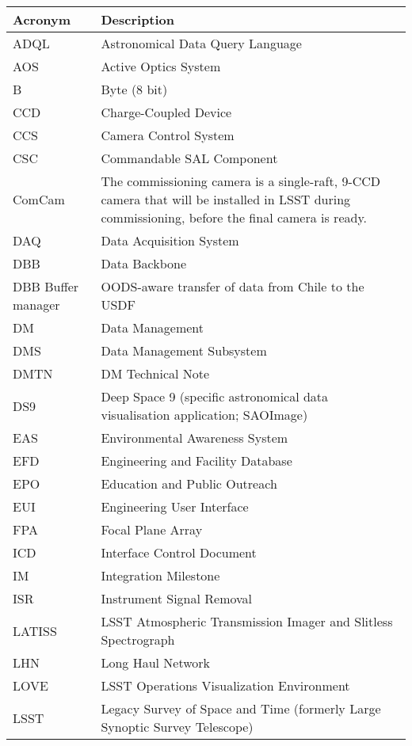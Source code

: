 \addtocounter{table}{-1}
\begin{longtable}{p{}p{}}\hline
\textbf{Acronym} & \textbf{Description}  \\\hline

ADQL & Astronomical Data Query Language \\\hline
AOS & Active Optics System \\\hline
B & Byte (8 bit) \\\hline
CCD & Charge-Coupled Device \\\hline
CCS & Camera Control System \\\hline
CSC & Commandable SAL Component \\\hline
ComCam & The commissioning camera is a single-raft, 9-CCD camera that will be installed in LSST during commissioning, before the final camera is ready. \\\hline
DAQ & Data Acquisition System \\\hline
DBB & Data Backbone \\\hline
DBB Buffer manager & OODS-aware transfer of data from Chile to the USDF \\\hline
DM & Data Management \\\hline
DMS & Data Management Subsystem \\\hline
DMTN & DM Technical Note \\\hline
DS9 & Deep Space 9 (specific astronomical data visualisation application; SAOImage) \\\hline
EAS & Environmental Awareness System \\\hline
EFD & Engineering and Facility Database \\\hline
EPO & Education and Public Outreach \\\hline
EUI & Engineering User Interface \\\hline
FPA & Focal Plane Array \\\hline
ICD & Interface Control Document \\\hline
IM & Integration Milestone \\\hline
ISR & Instrument Signal Removal \\\hline
LATISS & LSST Atmospheric Transmission Imager and Slitless Spectrograph \\\hline
LHN & Long Haul Network \\\hline
LOVE & LSST Operations Visualization Environment \\\hline
LSST & Legacy Survey of Space and Time (formerly Large Synoptic Survey Telescope) \\\hline

\end{longtable}

